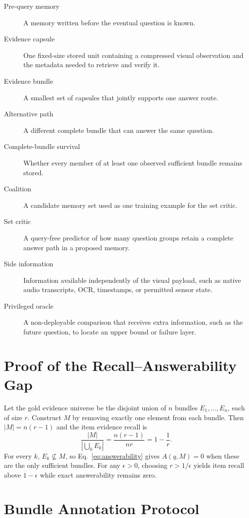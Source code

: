 \documentclass[10pt,twocolumn,letterpaper]{article}
\begin{document}
\begin{description}
    \item[Pre-query memory] A memory written before the eventual question is known.
    \item[Evidence capsule] One fixed-size stored unit containing a compressed visual observation and the metadata needed to retrieve and verify it.
    \item[Evidence bundle] A smallest set of capsules that jointly supports one answer route.
    \item[Alternative path] A different complete bundle that can answer the same question.
    \item[Complete-bundle survival] Whether every member of at least one observed sufficient bundle remains stored.
    \item[Coalition] A candidate memory set used as one training example for the set critic.
    \item[Set critic] A query-free predictor of how many question groups retain a complete answer path in a proposed memory.
    \item[Side information] Information available independently of the visual payload, such as native audio transcripts, OCR, timestamps, or permitted sensor state.
    \item[Privileged oracle] A non-deployable comparison that receives extra information, such as the future question, to locate an upper bound or failure layer.
\end{description}

\section{Proof of the Recall--Answerability Gap}
\label{app:proof}

Let the gold evidence universe be the disjoint union of $n$ bundles $E_1,\ldots,E_n$, each of size $r$.
Construct $M$ by removing exactly one element from each bundle.
Then $|M|=n(r-1)$ and the item evidence recall is
\begin{equation}
    \frac{|M|}{|\bigcup_k E_k|}=\frac{n(r-1)}{nr}=1-\frac{1}{r}.
\end{equation}
For every $k$, $E_k\nsubseteq M$, so Eq.~\eqref{eq:answerability} gives $A(q,M)=0$ when these are the only sufficient bundles.
For any $\epsilon>0$, choosing $r>1/\epsilon$ yields item recall above $1-\epsilon$ while exact answerability remains zero.

\section{Bundle Annotation Protocol}
\label{app:annotation}
\end{document}
